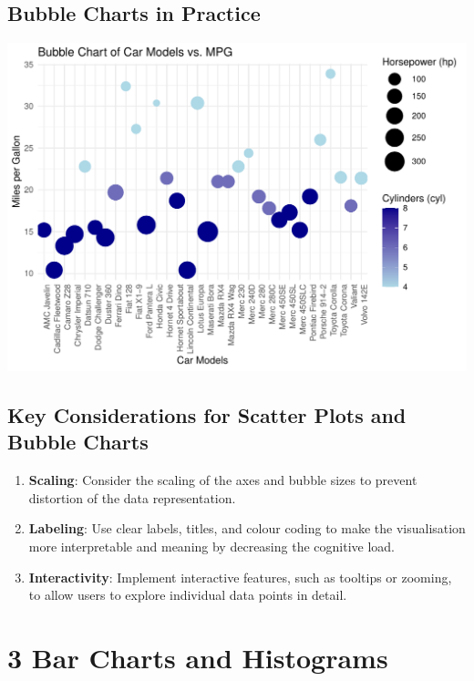 \documentclass{article}\usepackage[]{graphicx}\usepackage[]{xcolor}
\makeatletter
\def\maxwidth{ %
  \ifdim\Gin@nat@width>\linewidth
    \linewidth
  \else
    \Gin@nat@width
  \fi
}
\newenvironment{knitrout}{}{} %
\makeatother
\begin{document}
\subsection{Bubble Charts in Practice}
\begin{knitrout}
\color{fgcolor}
\includegraphics[width=\maxwidth]{figure/buble-plot-chunk-1} 
\end{knitrout}


\subsection{Key Considerations for Scatter Plots and Bubble Charts}
    \begin{enumerate}
        \item \textbf{Scaling}: Consider the scaling of the axes and bubble sizes to prevent distortion of the data representation.
        \item \textbf{Labeling}: Use clear labels, titles, and colour coding to make the visualisation more interpretable and meaning by decreasing the cognitive load. 
        \item \textbf{Interactivity}: Implement interactive features, such as tooltips or zooming, to allow users to explore individual data points in detail.
    \end{enumerate}


\section*{3 Bar Charts and Histograms}
\end{document}
